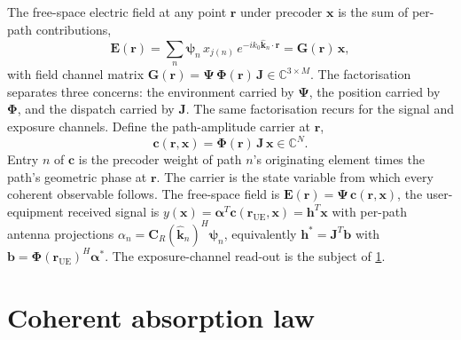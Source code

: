 \documentclass[journal,twocolumn,10pt]{IEEEtran}
\theoremstyle{plain}
\theoremstyle{remark}
\newcommand{\khat}{\hat{\bm{k}}}
\newcommand{\rr}{\mathbf{r}}
\newcommand{\xx}{\mathbf{x}}
\newcommand{\hh}{\mathbf{h}}
\newcommand{\bvec}{\mathbf{b}}
\newcommand{\GG}{\mathbf{G}}
\newcommand{\Jmat}{\mathbf{J}}
\newcommand{\Phimat}{\mathbf{\Phi}}
\newcommand{\Psimat}{\bm{\Psi}}
\newcommand{\psin}{\bm{\psi}_n}
\newcommand{\Complex}{\mathbb{C}}
\begin{document}
The free-space electric field at any point $\rr$ under precoder
$\xx$ is the sum of per-path contributions,
\begin{equation}\label{eq:E-decomp}
  \mathbf{E}(\rr)
  = \sum_n \psin\,x_{j(n)}\,e^{-i k_0 \khat_n \cdot \rr}
  = \GG(\rr)\,\xx,
\end{equation}
with field channel matrix
$\GG(\rr) = \Psimat\,\Phimat(\rr)\,\Jmat \in \Complex^{3 \times M}$.
The factorisation separates three concerns: the environment carried
by $\Psimat$, the position carried by $\Phimat$, and the dispatch
carried by $\Jmat$. The same factorisation recurs for the signal
and exposure channels. Define the path-amplitude carrier at $\rr$,
\begin{equation}\label{eq:carrier}
  \mathbf{c}(\rr, \xx) = \Phimat(\rr)\,\Jmat\,\xx \in \Complex^N.
\end{equation}
Entry $n$ of $\mathbf{c}$ is the precoder weight of path $n$'s
originating element times the path's geometric phase at $\rr$. The
carrier is the state variable from which every coherent observable
follows. The free-space field is $\mathbf{E}(\rr) = \Psimat\,
\mathbf{c}(\rr, \xx)$, the user-equipment received signal is
$y(\xx) = \bm\alpha^T \mathbf{c}(\rr_{\mathrm{UE}}, \xx) = \hh^T \xx$
with per-path antenna projections
$\alpha_n = \mathbf{C}_R(\khat_n)^H \psin$, equivalently
$\hh^* = \Jmat^T \bvec$ with
$\bvec = \Phimat(\rr_{\mathrm{UE}})^H \bm\alpha^*$. The
exposure-channel read-out is the subject of \cref{sec:coh-law}.


\section{Coherent absorption law}\label{sec:coh-law}
\end{document}

